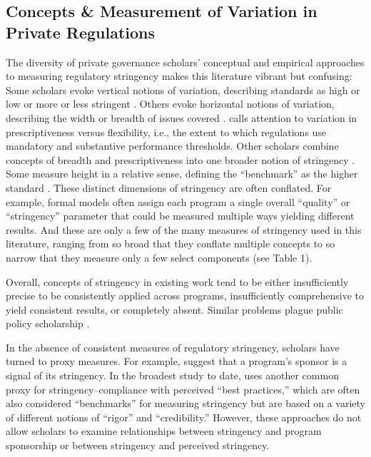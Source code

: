 \documentclass[
      12pt,
            Review ]{article}
\begin{document}
\subsection{Concepts \& Measurement of Variation in Private
Regulations}\label{concepts-measurement-of-variation-in-private-regulations}

The diversity of private governance scholars' conceptual and empirical
approaches to measuring regulatory stringency makes this literature
vibrant but confusing: Some scholars evoke vertical notions of
variation, describing standards as high or low or more or less stringent
\citep{Fischer2014, Li2015}. Others evoke horizontal notions of
variation, describing the width or breadth of issues covered
\citep{Auld2014, Heyes2017}. \citet{Cashore2007} calls attention to
variation in prescriptiveness versus flexibility, i.e., the extent to
which regulations use mandatory and substantive performance thresholds.
Other scholars combine concepts of breadth and prescriptiveness into one
broader notion of stringency \citep{Fransen2011}. Some measure height in
a relative sense, defining the ``benchmark'' as the higher standard
\citep{Overdevest2005, Overdevest2010}. These distinct dimensions of
stringency are often conflated. For example, formal models often assign
each program a single overall ``quality'' or ``stringency'' parameter
that could be measured multiple ways yielding different results. And
these are only a few of the many measures of stringency used in this
literature, ranging from so broad that they conflate multiple concepts
to so narrow that they measure only a few select components (see Table
1).

Overall, concepts of stringency in existing work tend to be either
insufficiently precise to be consistently applied across programs,
insufficiently comprehensive to yield consistent results, or completely
absent. Similar problems plague public policy scholarship
\citep{Brunel2016}.



In the absence of consistent measures of regulatory stringency, scholars
have turned to proxy measures. For example, \citet{Darnall2010} suggest
that a program's sponsor is a signal of its stringency. In the broadest
study to date, \citet{VanderVen2015} uses another common proxy for
stringency--compliance with perceived ``best practices,'' which are
often also considered ``benchmarks'' for measuring stringency but are
based on a variety of different notions of ``rigor'' and
``credibility.'' However, these approaches do not allow scholars to
examine relationships between stringency and program sponsorship or
between stringency and perceived stringency.
\end{document}
